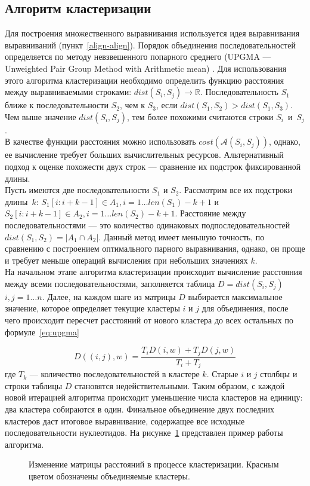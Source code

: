 \subsection[Алгоритм кластеризации]{\large Алгоритм кластеризации}
\hspace{\parindent} Для построения множественного выравнивания используется идея выравнивания выравниваний (пункт~\ref{align-align}). Порядок объединения последовательностей определяется по методу невзвешенного попарного среднего (UPGMA --- Unweighted Pair Group Method with Arithmetic mean) \cite{legendre1998numerical}. Для использования этого алгоритма кластеризации необходимо определить функцию расстояния между выравниваемыми строками: $dist(S_i, S_j) \rightarrow \mathbb{R}$. Последовательность $S_1$ ближе к последовательности $S_2$, чем к $S_3$, если $dist(S_1, S_2) > dist(S_1, S_3)$. Чем выше значение $dist(S_i, S_j)$, тем более похожими считаются строки $S_i$~и~$S_j$.\\
\indent В качестве функции расстояния можно использовать $cost(\mathcal{A}(S_i, S_j))$, однако, ее вычисление требует больших вычислительных ресурсов. Альтернативный подход к оценке похожести двух строк --- сравнение их подстрок фиксированной длины.\\
\indent Пусть имеются две последовательности $S_1$ и $S_2$. Рассмотрим все их подстроки длины~$k$: $S_1[i: i+k-1] \in A_1, i = 1\dots len(S_1)-k+1$ и $S_2[i: i+k-1] \in A_2, i = 1\dots len(S_2)-k+1$. Расстояние между последовательностями --- это количество одинаковых подпоследовательностей $dist(S_1, S_2) = |A_1\cap A_2|$. Данный метод имеет меньшую точность, по сравнению с построением оптимального парного выравнивания, однако, он проще и требует меньше операций вычисления при небольших значениях $k$.\\
\indent На начальном этапе алгоритма кластеризации происходит вычисление расстояния между всеми последовательностями, заполняется таблица $D=dist(S_i, S_j)$ $i,j=1 \dots n$. Далее, на каждом шаге из матрицы $D$ выбирается максимальное значение, которое определяет текущие кластеры $i$ и $j$ для объединения, после чего происходит пересчет расстояний от нового кластера до всех остальных по формуле~\ref{eq:upgma} 

\begin{equation}\label{eq:upgma}
D((i,j), w)=\frac{T_iD(i,w)+T_jD(j,w)}{T_i+T_j}
\end{equation}
где $T_k$ --- количество последовательностей в кластере $k$. Старые $i$ и $j$ столбцы и строки таблицы $D$ становятся недействительными. Таким образом, с каждой новой итерацией алгоритма происходит уменьшение числа кластеров на единицу: два кластера собираются в один. Финальное объединение двух последних кластеров даст итоговое выравнивание, содержащее все исходные последовательности нуклеотидов. На рисунке~\ref{ris:UPGMA} представлен пример работы алгоритма.
\begin{figure}[h]
	\caption{Изменение матрицы расстояний в процессе кластеризации. Красным цветом обозначены объединяемые кластеры.}
	\label{ris:UPGMA}
\end{figure}

